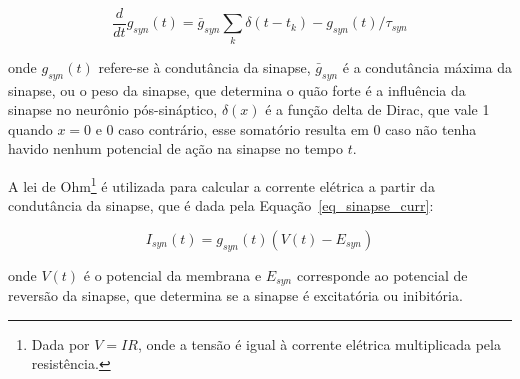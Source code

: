 \begin{equation}
\label{eq_sinapse}
\frac{d}{dt}g_{syn}(t) = \bar{g}_{syn}\sum_{k}{\delta(t-t_k)} - g_{syn}(t)/\tau_{syn}
\end{equation}

\noindent{}onde $g_{syn}(t)$ refere-se à condutância da sinapse, $\bar{g}_{syn}$ é a condutância máxima da sinapse, ou o peso da
sinapse, que determina o quão forte é a influência da sinapse no neurônio pós-sináptico, $\delta(x)$ é a função delta de Dirac, que
vale 1 quando $x=0$ e 0 caso contrário, esse somatório resulta em 0 caso não tenha havido nenhum potencial de ação na sinapse no
tempo $t$.

A lei de Ohm\footnote{Dada por $V=IR$, onde a tensão é igual à corrente elétrica multiplicada pela resistência.} é utilizada para
calcular a corrente elétrica a partir da condutância da sinapse, que é dada pela Equação~\ref{eq_sinapse_curr}:

\begin{equation}
\label{eq_sinapse_curr}
I_{syn}(t)=g_{syn}(t)(V(t)-E_{syn})
\end{equation}

\noindent{}onde $V(t)$ é o potencial da membrana e $E_{syn}$ corresponde ao potencial de reversão da sinapse, que determina se a sinapse é
excitatória ou inibitória.


